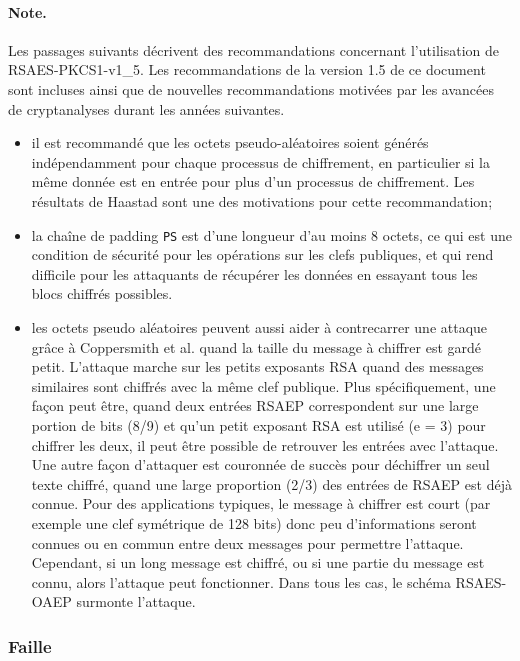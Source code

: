 \paragraph{Note. \\} 
Les passages suivants décrivent des recommandations concernant l'utilisation de RSAES-PKCS1-v1\_5. Les recommandations de la version 1.5 de ce document sont incluses ainsi que de nouvelles recommandations motivées par les avancées de cryptanalyses durant les années suivantes.
\begin{itemize}
\item il est recommandé que les octets pseudo-aléatoires soient générés indépendamment pour chaque processus de chiffrement, en particulier si la même donnée est en entrée pour plus d'un processus de chiffrement. Les résultats de Haastad sont une des motivations pour cette recommandation;
\item la chaîne de padding \texttt{PS} est d'une longueur d'au moins 8 octets, ce qui est une condition de sécurité pour les opérations sur les clefs publiques, et qui rend difficile pour les attaquants de récupérer les données en essayant tous les blocs chiffrés possibles.
\item les octets pseudo aléatoires peuvent aussi aider à contrecarrer une attaque grâce à Coppersmith et al. quand la taille du message à chiffrer est gardé petit. L'attaque marche sur les petits exposants RSA quand des messages similaires sont chiffrés avec la même clef publique. Plus spécifiquement, une façon peut être, quand deux entrées RSAEP correspondent sur une large portion de bits (8/9) et qu'un petit exposant RSA est utilisé (e = 3) pour chiffrer les deux, il peut être possible de retrouver les entrées avec l'attaque. Une autre façon d'attaquer est couronnée de succès pour déchiffrer un seul texte chiffré, quand une large proportion (2/3) des entrées de RSAEP est déjà connue. Pour des applications typiques, le message à chiffrer est court (par exemple une clef symétrique de 128 bits) donc peu d'informations seront connues ou en commun entre deux messages pour permettre l'attaque. Cependant, si un long message est chiffré, ou si une partie du message est connu, alors l'attaque peut fonctionner. Dans tous les cas, le schéma RSAES-OAEP surmonte l'attaque.\\
\end{itemize}

\subsubsection{Faille}


